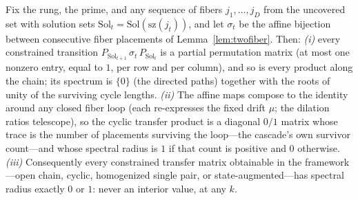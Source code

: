 \begin{lemma}\label{lem:monomial}
Fix the rung, the prime, and any sequence of fibers $j_1,\dots,j_D$
from the uncovered set with solution sets
$\mathrm{Sol}_t=\mathrm{Sol}(\mathrm{sz}(j_t))$, and let $\sigma_t$
be the affine bijection between consecutive fiber placements of
Lemma~\ref{lem:twofiber}. Then: \emph{(i)} every constrained
transition $P_{\mathrm{Sol}_{t+1}}\,\sigma_t\,P_{\mathrm{Sol}_t}$ is
a partial permutation matrix (at most one nonzero entry, equal to $1$,
per row and per column), and so is every product along the chain; its
spectrum is $\{0\}$ (the directed paths) together with the roots of
unity of the surviving cycle lengths. \emph{(ii)} The affine maps
compose to the identity around any closed fiber loop (each re-expresses
the fixed drift $\mu$; the dilation ratios telescope), so the cyclic
transfer product is a diagonal $0/1$ matrix whose trace is the number
of placements surviving the loop---the cascade's own survivor
count---and whose spectral radius is $1$ if that count is positive and
$0$ otherwise. \emph{(iii)} Consequently every constrained transfer
matrix obtainable in the framework---open chain, cyclic, homogenized
single pair, or state-augmented---has spectral radius exactly $0$ or
$1$: never an interior value, at any $k$.
\end{lemma}
